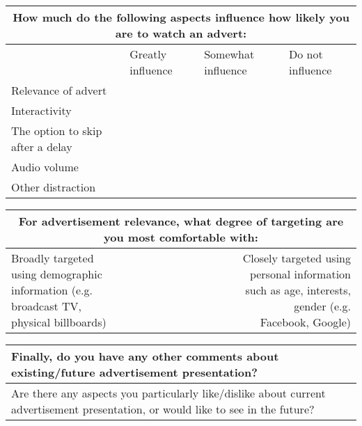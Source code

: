 	\begin{tabularx}{\linewidth}{X X X X}
		\toprule
		\multicolumn{4}{c}{\textbf{How much do the following aspects influence how likely you are to watch an advert:}} \\
		\midrule
		& Greatly influence & Somewhat influence & Do not influence \\
		Relevance of advert & & & \\
		Interactivity & & & \\
		The option to skip after a delay & & & \\
		Audio volume & & & \\
		Other distraction & & & \\
		\bottomrule
	\end{tabularx}


	\begin{tabularx}{\linewidth}{l X X X X X X X X X X r}
		\toprule
		\multicolumn{12}{c}{\textbf{For advertisement relevance, what degree of targeting are you most comfortable with:}} \\
		\midrule
		Broadly targeted using demographic information (e.g. broadcast TV, physical billboards)	& & & & & & & & & & & Closely targeted using personal information such as age, interests, gender (e.g. Facebook, Google) \\
		\bottomrule
	\end{tabularx}


	\begin{tabularx}{\linewidth}{X}
		\toprule
		\textbf{Finally, do you have any other comments about existing/future advertisement presentation?} \\
		\midrule
		Are there any aspects you particularly like/dislike about current advertisement presentation, or would like to see in the future? \\
		\bottomrule
	\end{tabularx}
